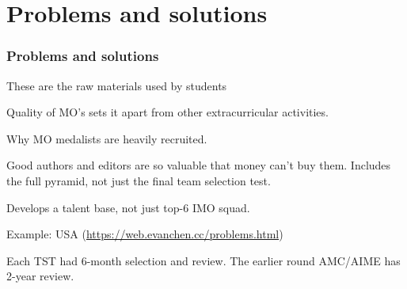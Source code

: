 \documentclass[11pt]{beamer}
\begin{document}
\section{Problems and solutions}
\begin{frame}
  \frametitle{Problems and solutions}
  \begin{block}{These are the raw materials used by students}
    \begin{itemize}
      \ii Quality of MO's sets it apart from other extracurricular activities.
      \begin{itemize}
        \ii Why MO medalists are heavily recruited.
      \end{itemize}
      \ii Good authors and editors are so valuable that money can't buy them.
      \ii Includes the full pyramid, not just the final team selection test.
      \begin{itemize}
        \ii Develops a talent base, not just top-6 IMO squad.
      \end{itemize}
    \end{itemize}
  \end{block}
  \pause
  \begin{exampleblock}{Example: USA {\footnotesize (\url{https://web.evanchen.cc/problems.html})}}
    \begin{itemize}
      \ii Each TST had \alert{6-month selection and review}.
      \ii The earlier round AMC/AIME has \alert{2-year review}.
    \end{itemize}
  \end{exampleblock}
\end{frame}
\end{document}
